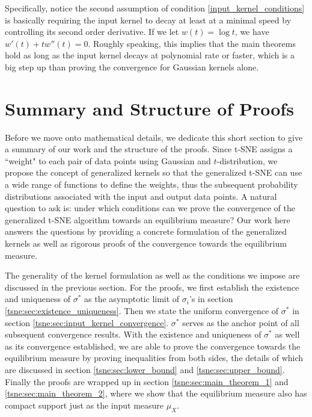 \documentclass[10pt]{article}
\newenvironment{Proof of lemma}{\noindent{\bf Proof of Lemma}}{\hfill$\Box$\newline}
\newenvironment{Proof of claim}{\noindent{\bf Proof of claim}}{\hfill$\Box$\newline}
\newenvironment{Proof of theorem}{\noindent{\bf Proof of Theorem}}{\hfill\scriptsize{$\Box$}\newline}
\newenvironment{Proof of theorems}{\noindent{\bf Proof of Theorems}}{\hfill$\Box$\newline}
\newenvironment{Proof of proposition}{\noindent{\bf Proof of Proposition}}{\hfill$\Box$\newline}
\newenvironment{Proof of propositions}{\noindent{\bf Proof of Propositions}}{\hfill$\Box$\newline}
\newenvironment{Proof of exercise}{\noindent{\it Proof of Exercise:}}{\hfill$\Box$}
\numberwithin{equation}{section}
\begin{document}
Specifically, notice the second assumption of condition
\ref{input_kernel_conditions} is basically requiring the input kernel to decay
at least at a minimal speed by controlling its second order derivative. If we
let $w(t) = \log t$, we have $w'(t)+tw''(t) = 0$. Roughly speaking, this
implies that the main theorems hold as long as the input kernel decays at
polynomial rate or faster, which is a big step up than proving the convergence
for Gaussian kernels alone.
\section{Summary and Structure of Proofs} \label{tsne:sec:summary_structure}
Before we move onto mathematical details, we dedicate this short section to
give a summary of our work and the structure of the proofs. Since t-SNE assigns
a ``weight" to each pair of data points using Gaussian and $t$-distribution, we
propose the concept of generalized kernels so that the generalized t-SNE can
use a wide range of functions to define the weights, thus the subsequent
probability distributions associated with the input and output data points. A
natural question to ask is: under which conditions can we prove the convergence
of the generalized t-SNE algorithm towards an equilibrium measure? Our work
here answers the questions by providing a concrete formulation of the
generalized kernels as well as rigorous proofs of the convergence towards the
equilibrium measure.

The generality of the kernel formulation as well as the conditions we impose
are discussed in the previous section. For the proofs, we first establish the
existence and uniqueness of $\sigma^*$ as the asymptotic limit of $\sigma_i$'s
in section \ref{tsne:sec:existence_uniqueness}. Then we state the uniform
convergence of $\sigma^*$ in section \ref{tsne:sec:input_kernel_convergence}.
$\sigma^*$ serves as the anchor point of all subsequent convergence results.
With the existence and uniqueness of $\sigma^*$ as well as its convergence
established, we are able to prove the convergence towards the equilibrium
measure by proving inequalities from both sides, the details of which are
discussed in section \ref{tsne:sec:lower_bound} and \ref{tsne:sec:upper_bound}.
Finally the proofs are wrapped up in section \ref{tsne:sec:main_theorem_1} and
\ref{tsne:sec:main_theorem_2}, where we show that the equilibrium measure also
has compact support just as the input measure $\mu_X$.
\end{document}
